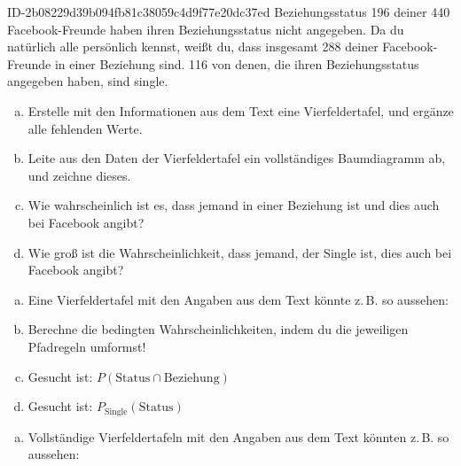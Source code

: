\begin{exercise}
      {ID-2b08229d39b094fb81c38059c4d9f77e20dc37ed}
      {Beziehungsstatus}
  \ifproblem\problem
    \num{196} deiner \num{440} Facebook-Freunde haben ihren Beziehungsstatus nicht angegeben.
    Da du natürlich alle persönlich kennst, weißt du, dass insgesamt \num{288} deiner
    Face\-book-Freunde in einer Beziehung sind. \num{116} von denen, die ihren
    Beziehungsstatus angegeben haben, sind single.
    \begin{enumerate}[a)]
      \item Erstelle mit den Informationen aus dem Text eine Vierfeldertafel,
            und ergänze alle fehlenden Werte.
      \item Leite aus den Daten der Vierfeldertafel ein vollständiges
            Baumdiagramm ab, und zeichne dieses.
      \item Wie wahrscheinlich ist es, dass jemand in einer Beziehung
            ist und dies auch bei Facebook angibt?
      \item Wie groß ist die Wahrscheinlichkeit, dass jemand, der Single ist,
            dies auch bei Facebook angibt?
    \end{enumerate}
  \fi
  \ifoutline\outline
    \begin{enumerate}[a)]
      \item Eine Vierfeldertafel mit den Angaben aus dem Text
            könnte z.\,B. so aussehen:
            \begin{center}
              \begin{fourfoldtable}
              \end{fourfoldtable}
            \end{center}
      \item Berechne die bedingten Wahrscheinlichkeiten, indem du die
            jeweiligen Pfadregeln umformst!
      \item Gesucht ist: $P(\text{Status}\cap\text{Beziehung})$
      \item Gesucht ist: $P_\text{Single}(\text{Status})$
    \end{enumerate}
  \fi
  \ifoutcome\outcome
    \begin{enumerate}[a)]
      \item Vollständige Vierfeldertafeln mit den Angaben aus dem Text
            könnten z.\,B. so aussehen:\par

\end{enumerate}
\end{exercise}
